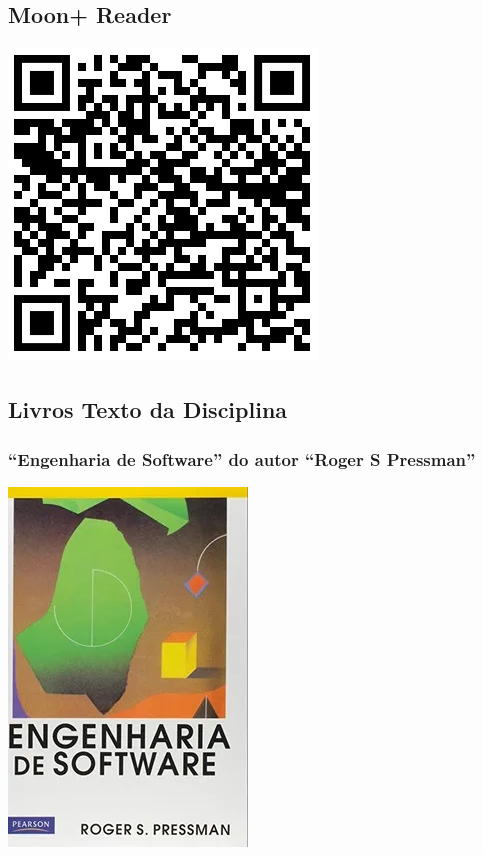 \documentclass[
]{book}
\begin{document}
\subsection{\texorpdfstring{\textbf{Moon+ Reader}}{Moon+ Reader}}\label{moon-reader}

\includegraphics{images/qrcode/leitor_epub/MoonReaderPlus.jpg}

\subsection{Livros Texto da Disciplina}\label{livros-texto-da-disciplina}

\subsubsection{``Engenharia de Software'' do autor ``Roger S Pressman''}\label{engenharia-de-software-do-autor-roger-s-pressman}

\includegraphics{images/livros/engenharia_software_pressman.jpg}
\end{document}
